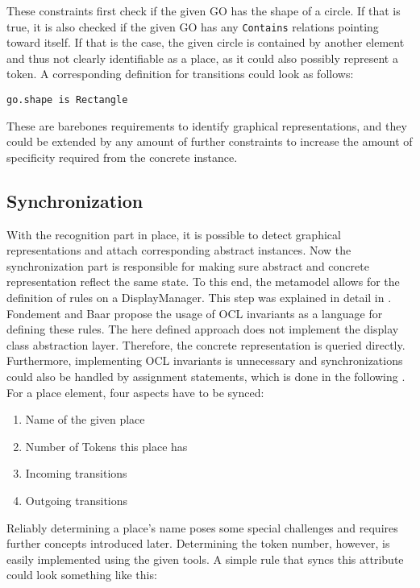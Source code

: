 These constraints first check if the given GO has the shape of a circle. If that is true, it is also checked if the given GO has any \texttt{Contains} relations pointing toward itself. If that is the case, the given circle is contained by another element and thus not clearly identifiable as a place, as it could also possibly represent a token. A corresponding definition for transitions could look as follows:

\begin{lstlisting}[captionpos=b,caption={Simple constraint to check for transition representations},label={lst:transition-constraints}]
go.shape is Rectangle
\end{lstlisting}

These are barebones requirements to identify graphical representations, and they could be extended by any amount of further constraints to increase the amount of specificity required from the concrete instance.

\subsection{Synchronization}
With the recognition part in place, it is possible to detect graphical representations and attach corresponding abstract instances. Now the synchronization part is responsible for making sure abstract and concrete representation reflect the same state. To this end, the metamodel allows for the definition of rules on a DisplayManager. This step was explained in detail in \cite{fondement_making_2005}. Fondement and Baar propose the usage of OCL invariants as a language for defining these rules. The here defined approach does not implement the display class abstraction layer. Therefore, the concrete representation is queried directly. Furthermore, implementing OCL invariants is unnecessary and synchronizations could also be handled by assignment statements, which is done in the following . For a place element, four aspects have to be synced:

\begin{enumerate}
  \item Name of the given place
  \item Number of Tokens this place has
  \item Incoming transitions
  \item Outgoing transitions
\end{enumerate}

Reliably determining a place's name poses some special challenges and requires further concepts introduced later. Determining the token number, however, is easily implemented using the given tools. A simple rule that syncs this attribute could look something like this:

